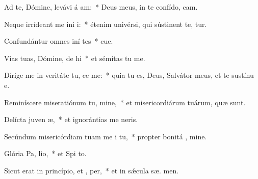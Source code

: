 \item Ad te, Dómine, levávi á am:~* Deus meus, in te confído,  cam.
\item Neque irrídeant me ini i:~* étenim univérsi, qui sústinent te,  tur.
\item Confundántur omnes iní tes~* cue.
\item Vias tuas, Dómine, de hi~* et sémitas tu  me.
\item Dírige me in veritáte tu,  ce me:~* quia tu es, Deus, Salvátor meus, et te sustínu  e.
\item Reminíscere miseratiónum tu, mine,~* et misericordiárum tuárum, quæ   sunt.
\item Delícta juven æ,~* et ignorántias me  neris.
\item Secúndum misericórdiam tuam me i tu,~* propter bonitá , mine.
\item Glória Pa,  lio,~* et Spi to.
\item Sicut erat in princípio, et ,  per,~* et in sǽcula sæ. men.
